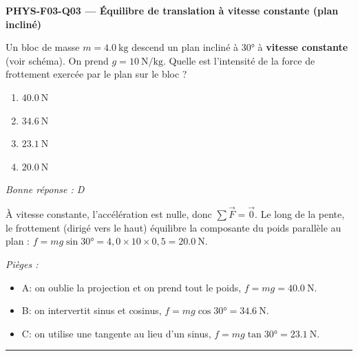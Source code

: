 \documentclass[11pt,a4paper]{article}
\newcommand{\vv}[1]{\vec{#1}}\newcommand{\ds}{\displaystyle}
\begin{document}
\noindent\textbf{PHYS-F03-Q03 --- Équilibre de translation à vitesse constante (plan incliné)}\par
Un bloc de masse $m = \qty{4.0}{\kilogram}$ descend un plan incliné à \ang{30} à \textbf{vitesse
constante} (voir schéma). On prend $g = \qty{10}{\newton\per\kilogram}$. Quelle est l'intensité de la
force de frottement exercée par le plan sur le bloc ?
\begin{center}
\end{center}
\begin{enumerate}[label=\Alph*)]
\item $\qty{40.0}{\newton}$
\item $\qty{34.6}{\newton}$
\item $\qty{23.1}{\newton}$
\item $\qty{20.0}{\newton}$
\end{enumerate}
\textit{Bonne réponse : D}\par
À vitesse constante, l'accélération est nulle, donc $\sum\vv F = \vv 0$. Le long de la pente, le
frottement (dirigé vers le haut) équilibre la composante du poids parallèle au plan :
$f = mg\sin\ang{30} = 4{,}0\times 10\times 0{,}5 = \qty{20.0}{\newton}$.\par
\textit{Pièges :}
\begin{itemize}
\item A: on oublie la projection et on prend tout le poids, $f = mg = \qty{40.0}{\newton}$.
\item B: on intervertit sinus et cosinus, $f = mg\cos\ang{30} = \qty{34.6}{\newton}$.
\item C: on utilise une tangente au lieu d'un sinus, $f = mg\tan\ang{30} = \qty{23.1}{\newton}$.
\end{itemize}
\vspace{8pt}\hrule\vspace{8pt}
\end{document}
